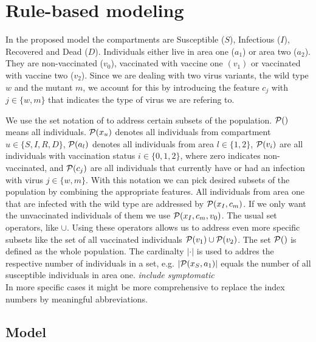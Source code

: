 \section{Rule-based modeling}

In the proposed model the compartments are Susceptible ($S$), Infectious ($I$), Recovered and Dead ($D$). Individuals either live in area one ($a_1$) or area two ($a_2$). They are non-vaccinated ($v_0$), vaccinated with vaccine one $(v_1)$ or vaccinated with vaccine two ($v_2$). Since we are dealing with two virus variants, the wild type $w$ and the mutant $m$, we account for this by introducing the feature $c_j$ with $j \in \{w,m\}$ that indicates the type of virus we are refering to. 
 
We use the set notation of \cite{Waites.2021} to address certain subsets of the population. $\mathcal{P}()$ means all individuals. $\mathcal{P}(x_u)$ denotes all individuals from compartment $u \in \{S, I, R, D \}$, $\mathcal{P}(a_l)$ denotes all individuals from area $l \in \{1,2\}$, $\mathcal{P}(v_i)$ are all individuals with vaccination status $i \in \{0,1,2\}$, where zero indicates non-vaccinated, and $\mathcal{P}(c_j)$ are all individuals that currently have or had an infection with virus $j \in \{w,m\}$. With this notation we can pick desired subsets of the population by combining the appropriate features. All individuals from area one that are infected with the wild type are addressed by $\mathcal{P}(x_I, c_m)$. If we only want the unvaccinated individuals of them we use $\mathcal{P}(x_I, c_m, v_0)$. The usual set operators, like $\cup$. Using these operators allows us to address even more specific subsets like the set of all vaccinated individuals $\mathcal{P}(v_1) \cup \mathcal{P}(v_2)$. The set $\mathcal{P}()$ is defined as the whole population. The cardinalty $|\cdot|$ is used to addres the respective number of individuals in a set, e.g. $|\mathcal{P}(x_S, a_1)|$ equals the number of all susceptible individuals in area one. \textit{include symptomatic}\\

In more specific cases it might be more comprehensive to replace the index numbers by meaningful abbreviations.

\subsection{Model}

